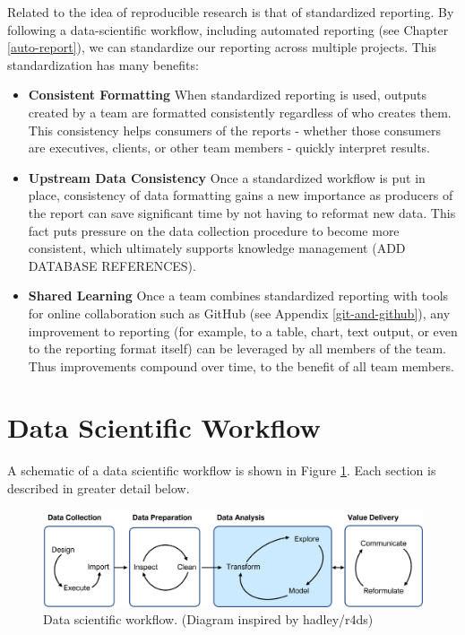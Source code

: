 \documentclass[
]{krantz}
\providecommand{\tightlist}{%
  \setlength{\itemsep}{0pt}\setlength{\parskip}{0pt}}
\begin{document}
Related to the idea of reproducible research is that of standardized reporting. By following a data-scientific workflow, including automated reporting (see Chapter \ref{auto-report}), we can standardize our reporting across multiple projects. This standardization has many benefits:

\begin{itemize}
\tightlist
\item
  \textbf{Consistent Formatting} When standardized reporting is used, outputs created by a team are formatted consistently regardless of who creates them. This consistency helps consumers of the reports - whether those consumers are executives, clients, or other team members - quickly interpret results.
\item
  \textbf{Upstream Data Consistency} Once a standardized workflow is put in place, consistency of data formatting gains a new importance as producers of the report can save significant time by not having to reformat new data. This fact puts pressure on the data collection procedure to become more consistent, which ultimately supports knowledge management (ADD DATABASE REFERENCES).
\item
  \textbf{Shared Learning} Once a team combines standardized reporting with tools for online collaboration such as GitHub (see Appendix \ref{git-and-github}), any improvement to reporting (for example, to a table, chart, text output, or even to the reporting format itself) can be leveraged by all members of the team. Thus improvements compound over time, to the benefit of all team members.
\end{itemize}

\hypertarget{data-scientific-workflow}{%
\section{Data Scientific Workflow}\label{data-scientific-workflow}}

A schematic of a data scientific workflow is shown in Figure \ref{fig:ds-workflow}. Each section is described in greater detail below.

\begin{figure}
\includegraphics[width=0.9\linewidth]{images/data_science_workflow2} \caption{Data scientific workflow. (Diagram inspired by hadley/r4ds)}\label{fig:ds-workflow}
\end{figure}
\end{document}
